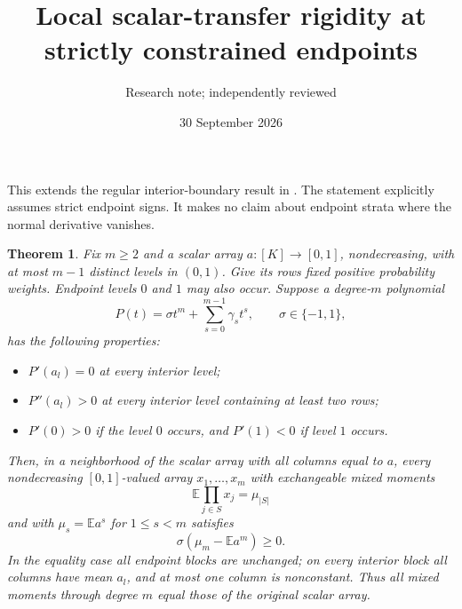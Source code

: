 \documentclass[11pt]{article}
\title{Local scalar-transfer rigidity at strictly constrained endpoints}
\author{Research note; independently reviewed}
\date{30 September 2026}
\newtheorem{theorem}{Theorem}
\newcommand{\E}{\mathbb E}
\begin{document}
\maketitle
This extends the regular interior-boundary result in
.
The statement explicitly assumes strict endpoint signs. It makes no
claim about endpoint strata where the normal derivative vanishes.

\begin{theorem}
Fix $m\ge2$ and a scalar array $a:[K]\to[0,1]$, nondecreasing,
with at most $m-1$ distinct levels in $(0,1)$. Give its rows fixed
positive probability weights. Endpoint levels $0$ and $1$ may also
occur. Suppose a degree-$m$ polynomial
\[
 P(t)=\sigma t^m+\sum_{s=0}^{m-1}\gamma_s t^s,
 \qquad \sigma\in\{-1,1\},
\]
has the following properties:
\begin{itemize}
\item $P'(a_l)=0$ at every interior level;
\item $P''(a_l)>0$ at every interior level containing at least two rows;
\item $P'(0)>0$ if the level $0$ occurs, and $P'(1)<0$ if level $1$ occurs.
\end{itemize}
Then, in a neighborhood of the scalar array with all columns equal
to $a$, every nondecreasing $[0,1]$-valued array $x_1,\ldots,x_m$
with exchangeable mixed moments
\[
 \E\prod_{j\in S}x_j=\mu_{|S|}
\]
and with $\mu_s=\E a^s$ for $1\le s<m$ satisfies
\[
 \sigma(\mu_m-\E a^m)\ge0.
\]
In the equality case all endpoint blocks are unchanged; on every
interior block all columns have mean $a_l$, and at most one column is
nonconstant. Thus all mixed moments through degree $m$ equal those
of the original scalar array.
\end{theorem}
\end{document}
